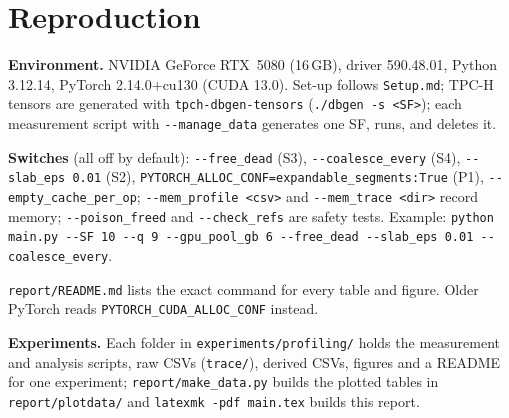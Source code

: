 \documentclass[10pt,twocolumn,letterpaper]{article}
\newcommand{\code}[1]{\texttt{\small #1}}
\begin{document}
\section{Reproduction}
\label{sec:repro}
\textbf{Environment.} NVIDIA GeForce RTX~5080 (16\,GB), driver 590.48.01, Python 3.12.14,
PyTorch 2.14.0+cu130 (CUDA 13.0). Set-up follows \code{Setup.md}; TPC-H tensors are generated
with \code{tpch-dbgen-tensors} (\code{./dbgen -s <SF>}); each measurement script with
\code{-{}-manage\_data} generates one SF, runs, and deletes it.

\textbf{Switches} (all off by default): \code{-{}-free\_dead} (S3), \code{-{}-coalesce\_every}
(S4), \code{-{}-slab\_eps 0.01} (S2), \code{PYTORCH\_ALLOC\_CONF=expandable\_segments:True}
(P1), \code{-{}-empty\_cache\_per\_op}; \code{-{}-mem\_profile <csv>} and \code{-{}-mem\_trace <dir>}
record memory; \code{-{}-poison\_freed} and \code{-{}-check\_refs} are safety tests. Example:
\code{python main.py -{}-SF 10 -{}-q 9 -{}-gpu\_pool\_gb 6 -{}-free\_dead -{}-slab\_eps 0.01 -{}-coalesce\_every}.

\code{report/README.md} lists the exact command for every table and figure. Older PyTorch
reads \code{PYTORCH\_CUDA\_ALLOC\_CONF} instead.

\textbf{Experiments.} Each folder in \code{experiments/profiling/} holds the measurement
and analysis scripts, raw CSVs (\code{trace/}), derived CSVs, figures and a README for one
experiment; \code{report/make\_data.py} builds the plotted tables in \code{report/plotdata/}
and \code{latexmk -pdf main.tex} builds this report.

\small


\end{document}
